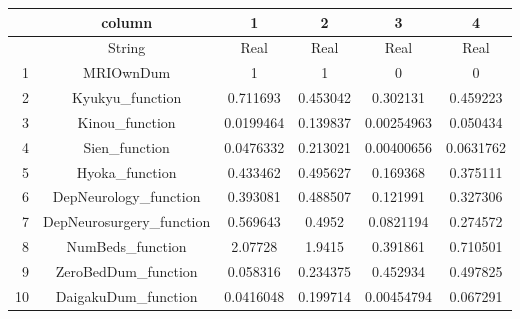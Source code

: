 \documentclass[
  letterpaper,
  DIV=11,
  numbers=noendperiod]{scrreprt}
\begin{document}
\begin{tabular}{r|ccccc}
    & column & 1 & 2 & 3 & 4\\
    \hline
    & String & Real & Real & Real & Real\\
    \hline
    1 & MRIOwnDum & 1 & 1 & 0 & 0 \\
    2 & Kyukyu\_function & 0.711693 & 0.453042 & 0.302131 & 0.459223 \\
    3 & Kinou\_function & 0.0199464 & 0.139837 & 0.00254963 & 0.050434 \\
    4 & Sien\_function & 0.0476332 & 0.213021 & 0.00400656 & 0.0631762 \\
    5 & Hyoka\_function & 0.433462 & 0.495627 & 0.169368 & 0.375111 \\
    6 & DepNeurology\_function & 0.393081 & 0.488507 & 0.121991 & 0.327306 \\
    7 & DepNeurosurgery\_function & 0.569643 & 0.4952 & 0.0821194 & 0.274572 \\
    8 & NumBeds\_function & 2.07728 & 1.9415 & 0.391861 & 0.710501 \\
    9 & ZeroBedDum\_function & 0.058316 & 0.234375 & 0.452934 & 0.497825 \\
    10 & DaigakuDum\_function & 0.0416048 & 0.199714 & 0.00454794 & 0.067291 \\
\end{tabular}
\end{document}

